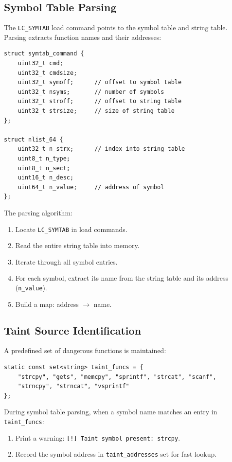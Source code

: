 \documentclass[12pt,a4paper]{article}
\begin{document}
\subsection{Symbol Table Parsing}

The \texttt{LC\_SYMTAB} load command points to the symbol table and string table. Parsing extracts function names and their addresses:

\begin{lstlisting}
struct symtab_command {
    uint32_t cmd;
    uint32_t cmdsize;
    uint32_t symoff;      // offset to symbol table
    uint32_t nsyms;       // number of symbols
    uint32_t stroff;      // offset to string table
    uint32_t strsize;     // size of string table
};

struct nlist_64 {
    uint32_t n_strx;      // index into string table
    uint8_t n_type;
    uint8_t n_sect;
    uint16_t n_desc;
    uint64_t n_value;     // address of symbol
};
\end{lstlisting}

The parsing algorithm:

\begin{enumerate}
  \item Locate \texttt{LC\_SYMTAB} in load commands.
  \item Read the entire string table into memory.
  \item Iterate through all symbol entries.
  \item For each symbol, extract its name from the string table and its address (\texttt{n\_value}).
  \item Build a map: address $\rightarrow$ name.
\end{enumerate}

\subsection{Taint Source Identification}

A predefined set of dangerous functions is maintained:

\begin{lstlisting}
static const set<string> taint_funcs = {
    "strcpy", "gets", "memcpy", "sprintf", "strcat", "scanf",
    "strncpy", "strncat", "vsprintf"
};
\end{lstlisting}

During symbol table parsing, when a symbol name matches an entry in \texttt{taint\_funcs}:

\begin{enumerate}
  \item Print a warning: \texttt{[!] Taint symbol present: strcpy}.
  \item Record the symbol address in \texttt{taint\_addresses} set for fast lookup.
\end{enumerate}
\end{document}
